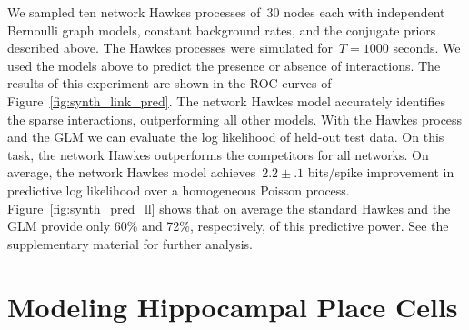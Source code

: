 We sampled ten network Hawkes processes of~$30$ nodes each with
independent Bernoulli graph models, constant background rates, and the
conjugate priors described above. The Hawkes
processes were simulated for~${T=1000}$ seconds. We used the models
above to predict the presence or absence of interactions. The results
of this experiment are shown in the ROC curves of
Figure~\ref{fig:synth_link_pred}. The network Hawkes model accurately
identifies the sparse interactions, outperforming all other models.
With the Hawkes process and the GLM we can evaluate the log likelihood
of held-out test data. On this task, the network Hawkes outperforms
the competitors for all networks. On average, the network Hawkes model
achieves~$2.2\pm.1$ bits/spike improvement in predictive log
likelihood over a homogeneous Poisson
process. Figure~\ref{fig:synth_pred_ll} shows that on average the
standard Hawkes and the GLM provide only 60\% and 72\%, respectively,
of this predictive power. See the supplementary material for further
analysis.

\section{Modeling Hippocampal Place Cells}

